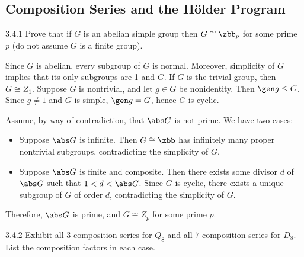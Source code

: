 \subsection{Composition Series and the H\"older Program}

\begin{exercise}{3.4.1}
    Prove that if $G$ is an abelian simple group then $G \cong \zbb_p$ for some prime $p$ (do not assume $G$ is a finite group).
\end{exercise}

\begin{sol}
    Since $G$ is abelian, every subgroup of $G$ is normal.
	Moreover, simplicity of $G$ implies that its only subgroups are 1 and $G$.
	If $G$ is the trivial group, then $G \cong Z_1$.
	Suppose $G$ is nontrivial, and let $g \in G$ be nonidentity.
	Then $\gen g \leq G$.
	Since $g \neq 1$ and $G$ is simple, $\gen g = G$, hence $G$ is cyclic.

    Assume, by way of contradiction, that $\abs G$ is not prime.
	We have two cases:
    \begin{itemize}
        \item Suppose $\abs G$ is infinite.
	Then $G \cong \zbb$ has infinitely many proper nontrivial subgroups, contradicting the simplicity of $G$.
        \item Suppose $\abs G$ is finite and composite.
	Then there exists some divisor $d$ of $\abs G$ such that $1 < d < \abs G$.
	Since $G$ is cyclic, there exists a unique subgroup of $G$ of order $d$, contradicting the simplicity of $G$.
    \end{itemize}
    Therefore, $\abs G$ is prime, and $G \cong Z_p$ for some prime $p$.
\end{sol}

\begin{exercise}{3.4.2}
    Exhibit all $3$ composition series for $Q_8$ and all $7$ composition series for $D_8$.
	List the composition factors in each case.
\end{exercise}

